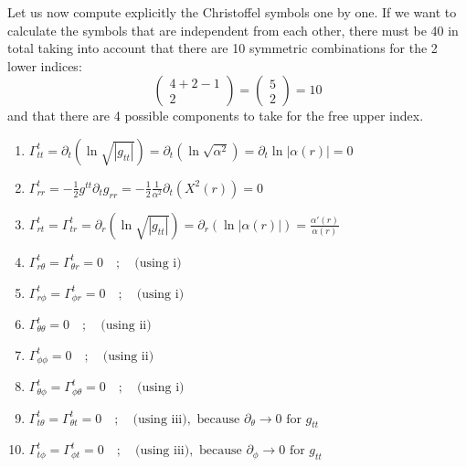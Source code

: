 \documentclass[12pt]{report}
\begin{document}
	Let us now compute explicitly the Christoffel symbols one by one. If we want to calculate the symbols that are independent from each other, there must be 40 in total taking into account that there are 10 symmetric combinations for the 2 lower indices:
	\begin{equation}
		\begin{pmatrix}
			4+2-1 \\
			2 
		\end{pmatrix} = \begin{pmatrix}
			5 \\
			2 
		\end{pmatrix} = 10
	\end{equation}
	and that there are 4 possible components to take for the free upper index.
	\begin{enumerate}
		\item $\Gamma^t_{tt} = \partial_t(\ln\sqrt{|g_{tt}|}) = \partial_t(\ln\sqrt{\alpha^2}) = \partial_t\ln|\alpha(r)| = 0$
		
		\item $\Gamma^t_{rr} = -\frac{1}{2}g^{tt}\partial_t g_{rr} = -\frac{1}{2}\frac{1}{\alpha^2}\partial_t(X^2(r)) = 0$
		
		\item $\Gamma^t_{rt} = \Gamma^t_{tr} = \partial_r(\ln\sqrt{|g_{tt}|}) = \partial_r(\ln|\alpha(r)|) = \frac{\alpha'(r)}{\alpha(r)}$
		
		\item $\Gamma^t_{r\theta} = \Gamma^t_{\theta r} = 0 \quad ; \quad \text{(using i)}$
		
		\item $\Gamma^t_{r\phi} = \Gamma^t_{\phi r} = 0\quad; \quad \text{(using i)}$
		
		\item $\Gamma^t_{\theta\theta} = 0 \quad ;\quad\text{(using ii)}$
		
		\item $\Gamma^t_{\phi\phi} = 0 \quad ;\quad \text{(using ii)}$
		
		\item $\Gamma^t_{\theta\phi} = \Gamma^t_{\phi\theta} = 0 \quad; \quad \text{(using i)}$
		
		\item $\Gamma^t_{t\theta} = \Gamma^t_{\theta t} = 0 \quad ; \quad \text{(using iii)}, \text{ because } \partial_\theta \to 0 \text{ for } g_{tt}$
		
		\item $\Gamma^t_{t\phi} = \Gamma^t_{\phi t} = 0 \quad ;\quad \text{(using iii)}, \text{ because }  \partial_\phi \to 0 \text{ for } g_{tt}$
		

\end{enumerate}
\end{document}
